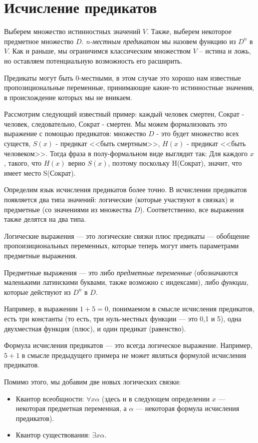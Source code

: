 \section{Исчисление предикатов}

Выберем множество истинностных значений $V$.
Также, выберем некоторое предметное множество $D$.
\emph{n-местным предикатом} мы назовем функцию из $D^n$ в $V$.
Как и раньше, мы ограничимся классическим множеством $V$ -- истина и ложь,
но оставляем потенциальную возможность его расширить.

Предикаты могут быть 0-местными, в этом случае это хорошо нам известные
пропозициональные переменные, принимающие какие-то истинностные значения, 
в происхождение которых мы не вникаем. 

Рассмотрим следующий известный пример: каждый человек смертен, Сократ - человек,
следовательно, Сократ - смертен. 
Мы можем формализовать это выражение с помощью предикатов: множество $D$ - это
будет множество всех существ, $S(x)$ - предикат <<быть смертным>>,
$H(x)$ - предикат <<быть человеком>>. Тогда фраза в полу-формальном виде
выглядит так:
Для каждого $x$, такого, что $H(x)$ верно $S(x)$, поэтому поскольку H(Сократ),
значит, что имеет место S(Сократ).

Определим язык исчисления предикатов более точно. В исчислении предикатов 
появляется два типа значений:
логические (которые участвуют в связках) и предметные (со значениями из множества $D$).
Соответственно, все выражения также делятся на два типа. 

Логические выражения --- это логические связки плюс
предикаты --- обобщение пропоизициональных переменных, которые теперь могут
иметь параметрами предметные выражения.

Предметные выражения --- это либо \emph{предметные переменные} (обозначаются 
маленькими латинскими буквами, также возможно с индексами), либо \emph{функции},
которые действуют из $D^n$ в $D$.

Например, в выражении $1+5=0$, понимаемом в смысле исчисления предикатов, есть 
три константы (то есть, три нуль-местных функции --- это 0,1 и 5), одна
двухместная функция (плюс), и один предикат (равенство).

Формула исчисления предикатов --- это всегда логическое выражение. Например, $5+1$ 
в смысле предыдущего примера не может являться формулой исчисления предикатов.

Помимо этого, мы добавим две новых логических связки:
\begin{itemize}
\item Квантор всеобщности: $\forall x \alpha$ (здесь и в следующем определении
$x$ --- некоторая предметная переменная, а $\alpha$ --- некоторая формула исчисления 
предикатов).
\item Квантор существования: $\exists x \alpha$.
\end{itemize}

